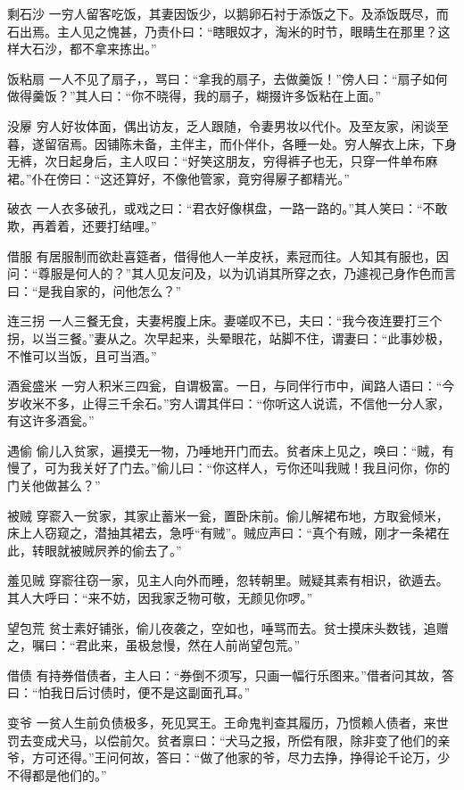\documentclass[12pt,UTF8]{ctexbook}
\begin{document}
剩石沙
一穷人留客吃饭，其妻因饭少，以鹅卵石衬于添饭之下。及添饭既尽，而石出焉。主人见之愧甚，乃责仆曰：“瞎眼奴才，淘米的时节，眼睛生在那里？这样大石沙，都不拿来拣出。”

饭粘扇
一人不见了扇子，，骂曰：“拿我的扇子，去做羹饭！”傍人曰：“扇子如何做得羹饭？”其人曰：“你不晓得，我的扇子，糊掇许多饭粘在上面。”

没屪
穷人好妆体面，偶出访友，乏人跟随，令妻男妆以代仆。及至友家，闲谈至暮，遂留宿焉。因铺陈未备，主伴主，而仆伴仆，各睡一处。穷人解衣上床，下身无裤，次日起身后，主人叹曰：“好笑这朋友，穷得裤子也无，只穿一件单布麻裙。”仆在傍曰：“这还算好，不像他管家，竟穷得屪子都精光。”

破衣
一人衣多破孔，或戏之曰：“君衣好像棋盘，一路一路的。”其人笑曰：“不敢欺，再着着，还要打结哩。”

借服
有居服制而欲赴喜筵者，借得他人一羊皮袄，素冠而往。人知其有服也，因问：“尊服是何人的？”其人见友问及，以为讥诮其所穿之衣，乃遽视己身作色而言曰：“是我自家的，问他怎么？”

连三拐
一人三餐无食，夫妻枵腹上床。妻嗟叹不已，夫曰：“我今夜连要打三个拐，以当三餐。”妻从之。次早起来，头晕眼花，站脚不住，谓妻曰：“此事妙极，不惟可以当饭，且可当酒。”

酒瓮盛米
一穷人积米三四瓮，自谓极富。一日，与同伴行市中，闻路人语曰：“今岁收米不多，止得三千余石。”穷人谓其伴曰：“你听这人说谎，不信他一分人家，有这许多酒瓮。”

遇偷
偷儿入贫家，遍摸无一物，乃唾地开门而去。贫者床上见之，唤曰：“贼，有慢了，可为我关好了门去。”偷儿曰：“你这样人，亏你还叫我贼！我且问你，你的门关他做甚么？”

被贼
穿窬入一贫家，其家止蓄米一瓮，置卧床前。偷儿解裙布地，方取瓮倾米，床上人窃窥之，潜抽其裙去，急呼“有贼”。贼应声曰：“真个有贼，刚才一条裙在此，转眼就被贼屄养的偷去了。”

羞见贼
穿窬往窃一家，见主人向外而睡，忽转朝里。贼疑其素有相识，欲遁去。其人大呼曰：“来不妨，因我家乏物可敬，无颜见你啰。”

望包荒
贫士素好铺张，偷儿夜袭之，空如也，唾骂而去。贫士摸床头数钱，追赠之，嘱曰：“君此来，虽极怠慢，然在人前尚望包荒。”

借债
有持券借债者，主人曰：“券倒不须写，只画一幅行乐图来。”借者问其故，答曰：“怕我日后讨债时，便不是这副面孔耳。”

变爷
一贫人生前负债极多，死见冥王。王命鬼判查其履历，乃惯赖人债者，来世罚去变成犬马，以偿前欠。贫者禀曰：“犬马之报，所偿有限，除非变了他们的亲爷，方可还得。”王问何故，答曰：“做了他家的爷，尽力去挣，挣得论千论万，少不得都是他们的。”
\end{document}
